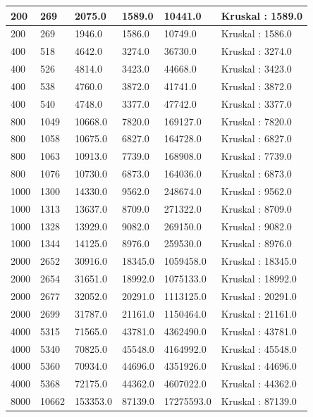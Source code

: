 \begin{longtable}[H]{|p{1.5cm}|p{1.5cm}|p{2cm}|p{2cm}|p{3cm}|p{3cm}|}
    200 & 269 & 2075.0 & 1589.0 & 10441.0 & Kruskal : 1589.0 \\ \hline 
    200 & 269 & 1946.0 & 1586.0 & 10749.0 & Kruskal : 1586.0 \\ \hline 
    400 & 518 & 4642.0 & 3274.0 & 36730.0 & Kruskal : 3274.0 \\ \hline 
    400 & 526 & 4814.0 & 3423.0 & 44668.0 & Kruskal : 3423.0 \\ \hline 
    400 & 538 & 4760.0 & 3872.0 & 41741.0 & Kruskal : 3872.0 \\ \hline 
    400 & 540 & 4748.0 & 3377.0 & 47742.0 & Kruskal : 3377.0 \\ \hline 
    800 & 1049 & 10668.0 & 7820.0 & 169127.0 & Kruskal : 7820.0 \\ \hline
    800 & 1058 & 10675.0 & 6827.0 & 164728.0 & Kruskal : 6827.0 \\ \hline
    800 & 1063 & 10913.0 & 7739.0 & 168908.0 & Kruskal : 7739.0 \\ \hline
    800 & 1076 & 10730.0 & 6873.0 & 164036.0 & Kruskal : 6873.0 \\ \hline
    1000 & 1300 & 14330.0 & 9562.0 & 248674.0 & Kruskal : 9562.0 \\ \hline
    1000 & 1313 & 13637.0 & 8709.0 & 271322.0 & Kruskal : 8709.0 \\ \hline
    1000 & 1328 & 13929.0 & 9082.0 & 269150.0 & Kruskal : 9082.0 \\ \hline
    1000 & 1344 & 14125.0 & 8976.0 & 259530.0 & Kruskal : 8976.0 \\ \hline
    2000 & 2652 & 30916.0 & 18345.0 & 1059458.0 & Kruskal : 18345.0 \\ \hline 
    2000 & 2654 & 31651.0 & 18992.0 & 1075133.0 & Kruskal : 18992.0 \\ \hline 
    2000 & 2677 & 32052.0 & 20291.0 & 1113125.0 & Kruskal : 20291.0 \\ \hline 
    2000 & 2699 & 31787.0 & 21161.0 & 1150464.0 & Kruskal : 21161.0 \\ \hline 
    4000 & 5315 & 71565.0 & 43781.0 & 4362490.0 & Kruskal : 43781.0 \\ \hline 
    4000 & 5340 & 70825.0 & 45548.0 & 4164992.0 & Kruskal : 45548.0 \\ \hline 
    4000 & 5360 & 70934.0 & 44696.0 & 4351926.0 & Kruskal : 44696.0 \\ \hline 
    4000 & 5368 & 72175.0 & 44362.0 & 4607022.0 & Kruskal : 44362.0 \\ \hline 
    8000 & 10662 & 153353.0 & 87139.0 & 17275593.0 & Kruskal : 87139.0 \\ \hline

\end{longtable}
